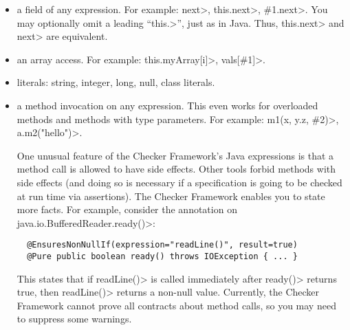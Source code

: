 \begin{itemize}
\item
  a field of any expression.  For example:  \<next>,
  \<this.next>, \<\#1.next>. %
  You may optionally omit a leading ``\<this.>'', just as in Java.  Thus,
  \<this.next> and \<next> are equivalent.

\item
  an array access.  For example:  \<this.myArray[i]>, \<vals[\#1]>.

\item literals: string, integer, long, null, class literals.

\item a method invocation on any expression.
  This even works for overloaded methods and methods with type parameters.
  For example:
  \<m1(x, y.z, \#2)>, \<a.m2("hello")>.

  One unusual feature of the Checker Framework's Java expressions is that a
  method call is allowed to have side effects.  Other tools forbid methods
  with side effects (and doing so is necessary if a specification is going
  to be checked at run time via assertions).  The Checker Framework enables
  you to state more facts.  For example, consider the annotation on
  \<java.io.BufferedReader.ready()>:

\begin{Verbatim}
  @EnsuresNonNullIf(expression="readLine()", result=true)
  @Pure public boolean ready() throws IOException { ... }
\end{Verbatim}

  This states that if \<readLine()> is called immediately after \<ready()>
  returns true, then \<readLine()> returns a non-null value.
  Currently, the Checker Framework cannot prove all contracts about method
  calls, so you may need to suppress some warnings.

\end{itemize}



